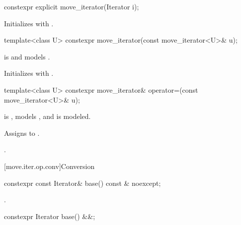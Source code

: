 %
\begin{itemdecl}
constexpr explicit move_iterator(Iterator i);
\end{itemdecl}

\begin{itemdescr}
\pnum
\effects
Initializes  with .
\end{itemdescr}


%
\begin{itemdecl}
template<class U> constexpr move_iterator(const move_iterator<U>& u);
\end{itemdecl}

\begin{itemdescr}
\pnum
\constraints
{} is  and
 models .

\pnum
\effects
Initializes  with .
\end{itemdescr}

%
\begin{itemdecl}
template<class U> constexpr move_iterator& operator=(const move_iterator<U>& u);
\end{itemdecl}

\begin{itemdescr}
\pnum
\constraints
{} is ,
 models , and
 is modeled.

\pnum
\effects
Assigns  to
.

\pnum
\returns
{}.
\end{itemdescr}

[move.iter.op.conv]{Conversion}

%
\begin{itemdecl}
constexpr const Iterator& base() const & noexcept;
\end{itemdecl}

\begin{itemdescr}
\pnum
\returns
{}.
\end{itemdescr}

%
\begin{itemdecl}
constexpr Iterator base() &&;
\end{itemdecl}

